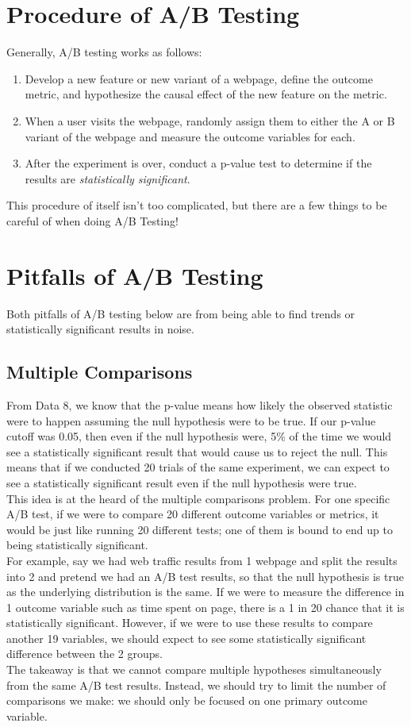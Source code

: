 \documentclass{article}
\begin{document}
\section{Procedure of A/B Testing}
Generally, A/B testing works as follows:
\begin{enumerate}
	\item Develop a new feature or new variant of a webpage, define the outcome metric, and hypothesize the causal effect of the new feature on the metric.
	\item When a user visits the webpage, randomly assign them to either the A or B variant of the webpage and measure the outcome variables for each.
	\item  After the experiment is over, conduct a p-value test to determine if the results are \textit{statistically significant}.
\end{enumerate}
This procedure of itself isn't too complicated, but there are a few things to be careful of when doing A/B Testing!

\section{Pitfalls of A/B Testing}
Both pitfalls of A/B testing below are from being able to find trends or statistically significant results in noise. 
\subsection{Multiple Comparisons}
From Data 8, we know that the p-value means how likely the observed statistic were to happen assuming the null hypothesis were to be true.
If our p-value cutoff was 0.05, then even if the null hypothesis were, 5\% of the time we would see a statistically significant result that would cause us to reject the null.
This means that if we conducted 20 trials of the same experiment, we can expect to see a statistically significant result even if the null hypothesis were true.
\\
This idea is at the heard of the multiple comparisons problem.
For one specific A/B test, if we were to compare 20 different outcome variables or metrics, it would be just like running 20 different tests; one of them is bound to end up to being statistically significant.
\\ 
For example, say we had web traffic results from 1 webpage and split the results into 2 and pretend we had an A/B test results, so that the null hypothesis is true as the underlying distribution is the same.
If we were to measure the difference in 1 outcome variable such as time spent on page, there is a 1 in 20 chance that it is statistically significant. 
However, if we were to use these results to compare another 19 variables, we should expect to see some statistically significant difference between the 2 groups.
\\
The takeaway is that we cannot compare multiple hypotheses simultaneously from the same A/B test results. 
Instead, we should try to limit the number of comparisons we make: we should only be focused on one primary outcome variable.
\end{document}
